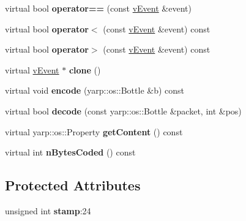 \begin{DoxyCompactItemize}
\item 
virtual bool {\bfseries operator==} (const \hyperlink{classev_1_1vEvent}{v\+Event} \&event)\hypertarget{classev_1_1vEvent_a294910360dc519411aad9c6162e2bece}{}\label{classev_1_1vEvent_a294910360dc519411aad9c6162e2bece}

\item 
virtual bool {\bfseries operator$<$} (const \hyperlink{classev_1_1vEvent}{v\+Event} \&event) const \hypertarget{classev_1_1vEvent_aed871fc1325a013061219459843d2b73}{}\label{classev_1_1vEvent_aed871fc1325a013061219459843d2b73}

\item 
virtual bool {\bfseries operator$>$} (const \hyperlink{classev_1_1vEvent}{v\+Event} \&event) const \hypertarget{classev_1_1vEvent_a5e6c2c5499df00db97c707c17dc00c67}{}\label{classev_1_1vEvent_a5e6c2c5499df00db97c707c17dc00c67}

\item 
virtual \hyperlink{classev_1_1vEvent}{v\+Event} $\ast$ {\bfseries clone} ()\hypertarget{classev_1_1vEvent_a1ec88aa748ba04cda2ff146067c77b7b}{}\label{classev_1_1vEvent_a1ec88aa748ba04cda2ff146067c77b7b}

\item 
virtual void {\bfseries encode} (yarp\+::os\+::\+Bottle \&b) const \hypertarget{classev_1_1vEvent_a66d9e4d833031c146cc0ac3af332b1cc}{}\label{classev_1_1vEvent_a66d9e4d833031c146cc0ac3af332b1cc}

\item 
virtual bool {\bfseries decode} (const yarp\+::os\+::\+Bottle \&packet, int \&pos)\hypertarget{classev_1_1vEvent_a75132601bf3f958212fd3793b7e53139}{}\label{classev_1_1vEvent_a75132601bf3f958212fd3793b7e53139}

\item 
virtual yarp\+::os\+::\+Property {\bfseries get\+Content} () const \hypertarget{classev_1_1vEvent_adabb906a71f96c89d6d539c899044622}{}\label{classev_1_1vEvent_adabb906a71f96c89d6d539c899044622}

\item 
virtual int {\bfseries n\+Bytes\+Coded} () const \hypertarget{classev_1_1vEvent_ad962c635597189c17957f3d73e64346d}{}\label{classev_1_1vEvent_ad962c635597189c17957f3d73e64346d}

\end{DoxyCompactItemize}
\subsection*{Protected Attributes}
\begin{DoxyCompactItemize}
\item 
unsigned int {\bfseries stamp}\+:24\hypertarget{classev_1_1vEvent_ad4e003653fa59b37682addefce835490}{}\label{classev_1_1vEvent_ad4e003653fa59b37682addefce835490}

\end{DoxyCompactItemize}


